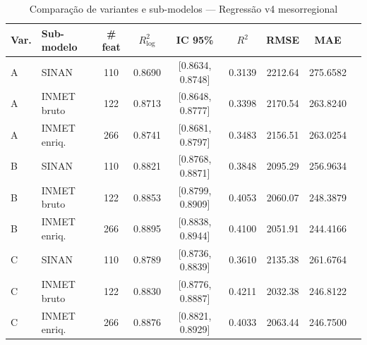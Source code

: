 \begin{table}[htbp]
\centering
\caption{Comparação de variantes e sub-modelos --- Regressão v4 mesorregional}
\label{tab:v4-regression-comparison}
\small
\begin{tabular}{llccccccc}
\toprule
Var. & Sub-modelo & \# feat & $R^2_{\log}$ & IC 95\% & $R^2$ & RMSE & MAE \\
\midrule
    A & SINAN & 110 & 0.8690 & [0.8634, 0.8748] & 0.3139 & 2212.64 & 275.6582 \\
    A & INMET bruto & 122 & 0.8713 & [0.8648, 0.8777] & 0.3398 & 2170.54 & 263.8240 \\
    A & INMET enriq. & 266 & 0.8741 & [0.8681, 0.8797] & 0.3483 & 2156.51 & 263.0254 \\
    B & SINAN & 110 & 0.8821 & [0.8768, 0.8871] & 0.3848 & 2095.29 & 256.9634 \\
    B & INMET bruto & 122 & 0.8853 & [0.8799, 0.8909] & 0.4053 & 2060.07 & 248.3879 \\
    B & INMET enriq. & 266 & 0.8895 & [0.8838, 0.8944] & 0.4100 & 2051.91 & 244.4166 \\
    C & SINAN & 110 & 0.8789 & [0.8736, 0.8839] & 0.3610 & 2135.38 & 261.6764 \\
    C & INMET bruto & 122 & 0.8830 & [0.8776, 0.8887] & 0.4211 & 2032.38 & 246.8122 \\
    C & INMET enriq. & 266 & 0.8876 & [0.8821, 0.8929] & 0.4033 & 2063.44 & 246.7500 \\
\bottomrule
\end{tabular}
\end{table}
